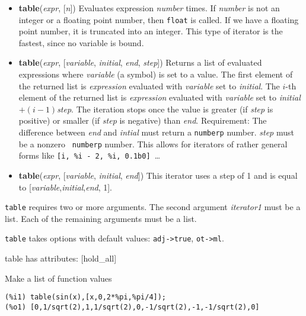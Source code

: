 \documentclass[]{article}
\begin{document}
\vspace{5 pt}
\begin{itemize}
\item[] {\bf table}({\it expr}, [{\it n}])
  Evaluates expression {\it number} times. If {\it number} is not an integer or a floating point number, then {\tt float} is called. If we have a floating point number, it is truncated into an integer. This type of iterator is the fastest, since no variable is bound. 

\item[] {\bf table}({\it expr}, [{\it variable}, {\it initial}, {\it end}, {\it step}])
  Returns a list of evaluated expressions where {\it variable} (a symbol) is set to a value. The first element of the returned list is {\it expression} evaluated with {\it variable} set to {\it initial}. The $i$-th element of the returned list is {\it expression} evaluated with {\it variable} set to 
{\it initial}$ + (i-1) ${\it step}. The iteration stops once the value is greater (if {\it step} is positive) or smaller (if {\it step} is negative) than {\it end}. Requirement: The difference between {\it end} and {\it intial} must return a {\tt numberp} number. {\it step} must be a nonzero {\tt 
numberp} number. This allows for iterators of rather general forms like \verb#[i, %i - 2, %i, 0.1b0] #\ldots 

\item[] {\bf table}({\it expr}, [{\it variable}, {\it initial}, {\it end}])
  This iterator uses a step of 1 and is equal to [{\it variable},{\it initial},{\it end}, 1]. 

\end{itemize}
   {\tt table} requires two or more arguments.
    The second argument {\it iterator1} must be a list.
   Each of the remaining arguments must be a list.


\vspace{5 pt}

{\tt table} takes options with default values: {\tt adj->true}, {\tt ot->ml}.
\vspace{5 pt}

table has attributes: [hold\_all]

\vspace{5 pt}


   Make a list of function values 

\begin{Verbatim}[frame=single]
(%i1) table(sin(x),[x,0,2*%pi,%pi/4]);
(%o1) [0,1/sqrt(2),1,1/sqrt(2),0,-1/sqrt(2),-1,-1/sqrt(2),0]
\end{Verbatim}
\end{document}
